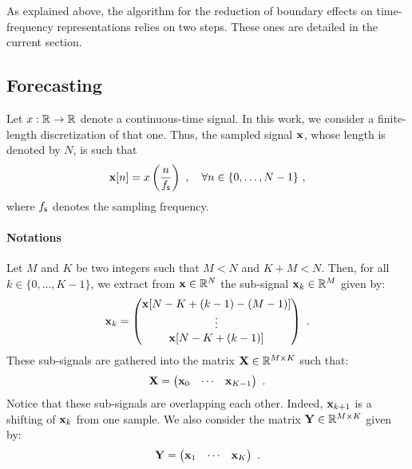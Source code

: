 As explained above, the algorithm for the reduction of boundary effects on time-frequency representations relies on two steps. These ones are detailed in the current section.

\subsection{Forecasting}

Let $x:{\mathbb R}\to{\mathbb R}$ denote a continuous-time signal. In this work, we consider a finite-length discretization of that one. Thus, the sampled signal ${\mathbf x}$, whose length is denoted by $N$, is such that
\[
\bx[n] = x\left(\frac{n}{\fs}\right)\ ,\quad \forall n\in\{0,\ldots,N-1\}\ , 
\]
where $f_{\mathsf s}$ denotes the sampling frequency. 

\paragraph{Notations} 
Let $M$ and $K$ be two integers such that $M<N$ and $K+M<N$. Then, for all $k\in\{0,\ldots,K-1\}$, we extract from ${\mathbf x}\in{\mathbb R}^N$ the sub-signal ${\mathbf x}_k\in{\mathbb R}^M$ given by:
\begin{equation}
\bx_k = 
\begin{pmatrix}
\bx[N-K+(k-1)-(M-1)] \\
\vdots \\
\bx[N-K+(k-1)]
\end{pmatrix}\ .
\label{eq:xk}
\end{equation} 
These sub-signals are gathered into the matrix ${\mathbf X}\in{\mathbb R}^{M\times K}$ such that:
\begin{equation*}
{\mathbf X} = 
\begin{pmatrix}
{\mathbf x}_0 & \cdots & {\mathbf x}_{K-1}
\end{pmatrix}\ .
\end{equation*}
Notice that these sub-signals are overlapping each other. Indeed, ${\mathbf x}_{k+1}$ is a shifting of ${\mathbf x}_k$ from one sample. We also consider the matrix ${\mathbf Y}\in{\mathbb R}^{M\times K}$ given by:
\begin{equation*}
{\mathbf Y} = 
\begin{pmatrix}
{\mathbf x}_1 & \cdots & {\mathbf x}_{K}
\end{pmatrix}\ .
\end{equation*}


